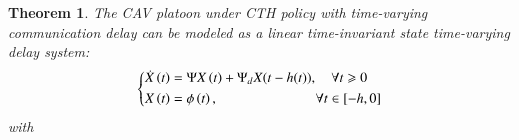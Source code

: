 \documentclass[journal]{IEEEtran}
\newtheorem{theorem}{Theorem}
\begin{document}
\begin{theorem}
  \label{theorem3}
  The CAV platoon under CTH policy with time-varying communication delay can be modeled as a linear time-invariant state time-varying delay system:
  \begin{equation}
    \left\{ \begin{gathered}
      \dot X\left( t \right) = \Psi X\left( t \right) + {\Psi _d}X(t - h(t)),\quad \forall t \geqslant 0 \hfill \\
      X\left( t \right) = \phi \left( t \right),\quad \quad \quad \quad \quad \quad \quad \forall t \in \left[ { - h,0} \right] \hfill \\
    \end{gathered}  \right.
    \label{eq13}
  \end{equation}
  with
  

\end{theorem}
\end{document}
